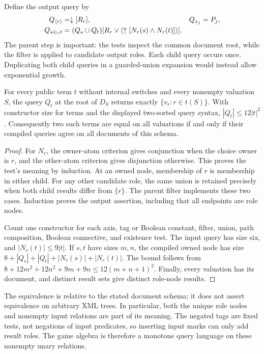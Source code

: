 Define the output query by
\begin{align*}
 Q_{\langle r\rangle}&=\downarrow[R_r], &Q_{x_j}&=P_j,\\
 Q_{s\mathbin{\oplus_{r}} t}
   &=(Q_s\cup Q_t)
       [R_r\lor\langle\uparrow[N_r(s)\land N_r(t)]\rangle].
\end{align*}
The parent step is important: the tests inspect the common document
root, while the filter is applied to candidate output roles. Each child
query occurs once. Duplicating both child queries in a guarded-union
expansion would instead allow exponential growth.

\begin{theorem}\label{query:thm:compilation}
For every public term $t$ without internal switches and every nonempty
valuation $S$, the query $Q_t$ at the root of $D_S$ returns exactly
$\{v_r:r\in t(S)\}$. With constructor size for terms and the displayed
two-sorted query syntax, $|Q_t|\leq12|t|^2$.
Consequently two such terms are equal on all valuations if and only if
their compiled queries agree on all documents of this schema.
\end{theorem}
\begin{proof}
For $N_r$, the owner-atom criterion gives conjunction when the choice
owner is $r$, and the other-atom criterion gives disjunction otherwise.
This proves the test's meaning by induction. At an owned node, membership
of $r$ is membership in either child. For any other candidate role, the
same union is retained precisely when both child results differ from
$\{r\}$. The parent filter implements these two cases. Induction proves
the output assertion, including that all endpoints are role nodes.

Count one constructor for each axis, tag or Boolean constant, filter,
union, path composition, Boolean connective, and existence test. The
input query has size six, and $|N_r(t)|\leq9|t|$. If $s,t$ have sizes
$m,n$, the compiled owned node has size
$8+|Q_s|+|Q_t|+|N_r(s)|+|N_r(t)|$.
The bound follows from
$8+12m^2+12n^2+9m+9n\leq12(m+n+1)^2$.
Finally, every valuation has its document, and distinct result sets
give distinct role-node results.
\end{proof}

The equivalence is relative to the stated document schema; it does not
assert equivalence on arbitrary XML trees. In particular, both the unique
role nodes and nonempty input relations are part of its meaning. The
negated tags are fixed tests, not negations of input predicates, so
inserting input marks can only add result roles. The game algebra is
therefore a monotone query language on these nonempty unary relations.

